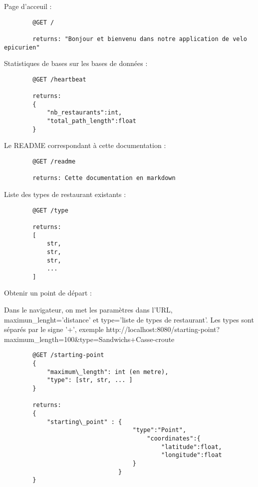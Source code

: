 \documentclass[12pt]{article}
\begin{document}
    Page d'acceuil :

    \begin{lstlisting}
        @GET /

        returns: "Bonjour et bienvenu dans notre application de velo epicurien"
    \end{lstlisting}

    Statistiques de bases sur les bases de données :

    \begin{lstlisting}
        @GET /heartbeat

        returns:
        {
            "nb_restaurants":int,
            "total_path_length":float
        }
    \end{lstlisting}

    Le README correspondant à cette documentation :

    \begin{lstlisting}
        @GET /readme
        
        returns: Cette documentation en markdown
    \end{lstlisting}

    Liste des types de restaurant existants :
    
    \begin{lstlisting}
        @GET /type

        returns:
        [
            str,
            str,
            str,
            ...
        ]
    \end{lstlisting}

    Obtenir un point de départ : 

    Dans le navigateur, on met les paramètres dans l'URL, maximun\_lenght='distance' et type='liste de types de restaurant'. Les types sont séparés par le signe '+', exemple http://localhost:8080/starting-point?maximum\_length=100\&type=Sandwichs+Casse-croute

    \begin{lstlisting}
        @GET /starting-point
        {
            "maximum\_length": int (en metre),
            "type": [str, str, ... ]
        }

        returns:
        {
            "starting\_point" : {
                                    "type":"Point", 
                                        "coordinates":{
                                            "latitude":float, 
                                            "longitude":float
                                    }
                                }
        }
    \end{lstlisting}
\end{document}
